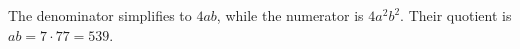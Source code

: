 The denominator simplifies to $4ab$, while the numerator is $4a^2b^2$. Their quotient is $ab=7\cdot77=\boxed{539}$.
